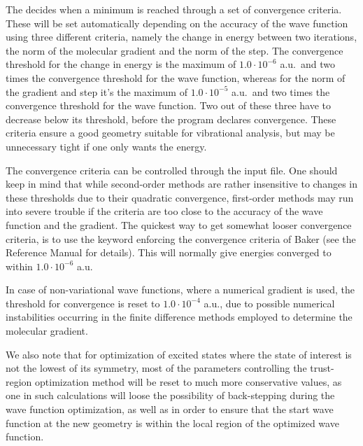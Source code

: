 The  decides when a minimum is reached through a set of
convergence criteria. These will be
set automatically depending on the accuracy of the wave function
using three different criteria, namely the change in energy
between two iterations, the norm of the molecular
gradient and the norm of the
step. The convergence threshold for the change
in energy is the maximum of $1.0\cdot 10^{-6}$ a.u.\ and two times the
convergence threshold for the wave function, whereas for the norm of
the gradient and step it's the maximum of $1.0\cdot 10^{-5}$ a.u.\ and
two times the 
convergence threshold for the wave function. Two out of these
three have to decrease below its threshold, before the program
declares convergence. These criteria ensure a good geometry
suitable for vibrational analysis, but may be unnecessary tight if
one only wants the energy.

The convergence criteria can be controlled through the input file. One
should keep in mind that while second-order methods are rather
insensitive to changes in these thresholds due to their quadratic
convergence, first-order methods may run into severe trouble if the
criteria are too close to the accuracy of the wave function and the
gradient. The quickest way to get somewhat looser convergence
criteria, is to use the keyword  enforcing the convergence
criteria of Baker\cite{Baker} (see the Reference Manual for
details). This will normally give energies converged to within
$1.0\cdot 10^{-6}$ a.u.

In case of non-variational
wave functions, where a numerical gradient is used, the threshold for convergence is reset to
$1.0\cdot 10^{-4}$ a.u., due to possible numerical instabilities
occurring 
in the 
finite difference methods employed to
determine the molecular gradient.

We also note that for optimization of excited states where the state of interest is not the lowest of its
symmetry, most of the parameters controlling the trust-region
optimization method will be reset to much more conservative
values, as one in such calculations will loose the possibility of
back-stepping during the wave function optimization, as well as in
order to ensure that the start wave function at the new geometry
is within the local region of the optimized wave function.

